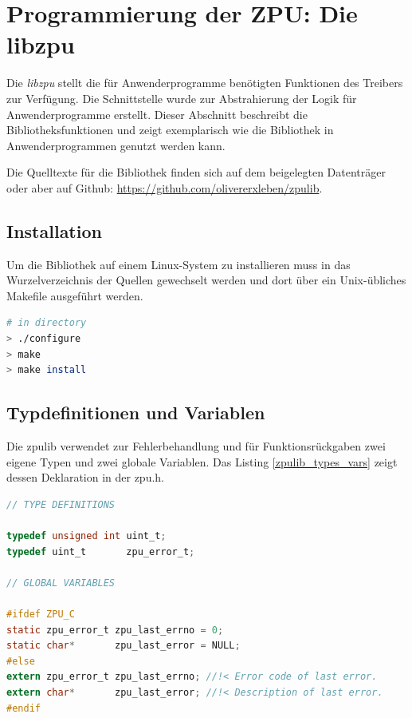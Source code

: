\documentclass[11pt]{scrartcl}
\begin{document}
\pagebreak
\section{Programmierung der ZPU: Die libzpu}
\label{chapter_libzpu}

Die \textit{libzpu} stellt die für Anwenderprogramme benötigten Funktionen des Treibers zur Verfügung. Die Schnittstelle wurde zur Abstrahierung der Logik für Anwenderprogramme erstellt. Dieser Abschnitt beschreibt die Bibliotheksfunktionen und zeigt exemplarisch wie die Bibliothek in Anwenderprogrammen genutzt werden kann. 

Die Quelltexte für die Bibliothek finden sich auf dem beigelegten Datenträger oder aber auf Github: \url{https://github.com/olivererxleben/zpulib}. 

\subsection{Installation}
Um die Bibliothek auf einem Linux-System zu installieren muss in das Wurzelverzeichnis der Quellen gewechselt werden und dort über ein Unix-übliches Makefile ausgeführt werden.

\begin{lstlisting}[language=bash,caption=Installation der zpulib-Bibliothek]
# in directory
> ./configure
> make
> make install
\end{lstlisting}

\subsection{Typdefinitionen und Variablen}

Die zpulib verwendet zur Fehlerbehandlung und für Funktionsrückgaben zwei eigene Typen und zwei globale Variablen. Das Listing \ref{zpulib_types_vars} zeigt dessen Deklaration in der zpu.h.

\begin{lstlisting}[language=C,firstnumber=28,caption=zpulib Typen und Variblen,label=zpulib_types_vars]
// TYPE DEFINITIONS

typedef unsigned int uint_t;
typedef uint_t       zpu_error_t;

// GLOBAL VARIABLES

#ifdef ZPU_C
static zpu_error_t zpu_last_errno = 0;
static char*       zpu_last_error = NULL;
#else
extern zpu_error_t zpu_last_errno; //!< Error code of last error.
extern char*       zpu_last_error; //!< Description of last error.
#endif

\end{lstlisting}
\end{document}
